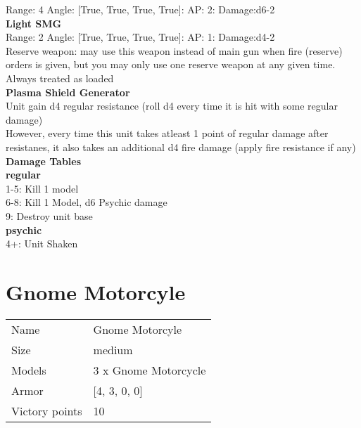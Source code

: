 Range: 4  Angle: [True, True, True, True]: AP: 2: Damage:d6-2 \\




{\bf Light SMG } \\



Range: 2  Angle: [True, True, True, True]: AP: 1: Damage:d4-2 \\
Reserve weapon: may use this weapon instead of main gun when fire (reserve) orders is given, but you may only use one reserve weapon at any given time.\\ 
Always treated as loaded\\ 




{\bf Plasma Shield Generator } \\

Unit gain d4 regular resistance (roll d4 every time it is hit with some regular damage)\\ 
However, every time this unit takes atleast 1 point of regular damage after resistanes, it also takes an additional d4 fire damage (apply fire resistance if any)\\ 





 





{\bf Damage Tables} \\
 {\bf regular } \\
1-5: Kill 1 model \\
6-8: Kill 1 Model, d6 Psychic damage \\
9: Destroy unit base \\
 {\bf psychic } \\
4+: Unit Shaken \\










\pagebreak\pagebreak

\section{ Gnome Motorcyle }

\begin{tabular}{ll}
  Name & Gnome Motorcyle \\
  Size & medium\\
  Models & 3 x Gnome Motorcycle\\
  Armor & [4, 3, 0, 0]\\
  Victory points & 10\\
\end{tabular}

